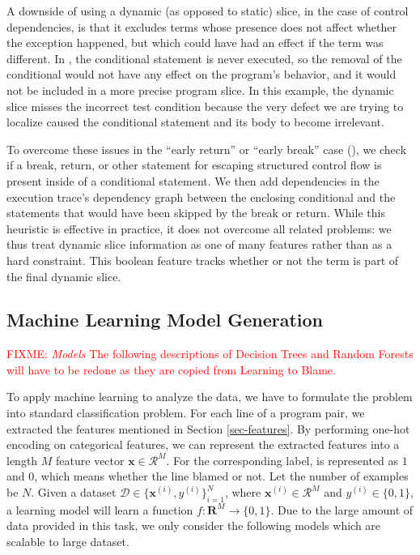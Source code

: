 \documentclass[conference]{IEEEtran}
\newcommand{\fixme}[1]{\textcolor{red}{FIXME: #1}}
\begin{document}
A downside of using a dynamic (as opposed to static) slice, in the case of
control dependencies, is that it excludes terms whose presence does not
affect whether the exception happened, but which could have had an effect
if the term was different. In
, the conditional statement is never
executed, so the removal of the conditional would not have any effect on
the program's behavior, and it would not be included in a more precise
program slice. In this example, the dynamic slice misses the incorrect
test condition because the very defect we are trying to localize
caused the conditional statement and its body to become irrelevant.

To overcome these issues in the ``early return'' or ``early break'' case
(), we check if a break, return, or other statement for
escaping structured control flow is present inside of a conditional
statement. We then add dependencies in the execution trace's dependency graph
between the enclosing conditional and the statements that would have been skipped
by the break or return. While this heuristic is effective in practice, it
does not overcome all related problems: we thus treat dynamic slice
information as one of many features rather than as a hard constraint.
This boolean feature tracks whether or not the term is part of the final
dynamic slice.

\subsection{Machine Learning Model Generation}
\label{sec-model}

\fixme{
\emph{Models} The following descriptions of Decision Trees and
Random Forests will have to be redone as they are copied from Learning to Blame.
}

To apply machine learning to analyze the data, we have to formulate the
problem into standard classification problem.
For each line of a program pair, we extracted the features mentioned in
Section \ref{sec-features}.
By performing one-hot encoding on categorical features, we can represent the
extracted features into a length $M$ feature vector $\mathbf{x} \in
\mathcal{R}^{M}$.
For the corresponding label, is represented as $1$ and $0$, which means whether
the line blamed or not.
Let the number of examples be $N$.
Given a dataset $\mathcal{D} \in \{\mathbf{x}^{(i)}, y^{(i)}\}^{N}_{i=1}$,
where $\mathbf{x}^{(i)} \in \mathcal{R}^{M}$ and $y^{(i)} \in \{0, 1\}$,
a learning model will learn a function $f: \mathbf{R}^{M} \to \{0, 1\}$.
Due to the large amount of data provided in this task, we only consider the
following models which are scalable to large dataset.
\end{document}
